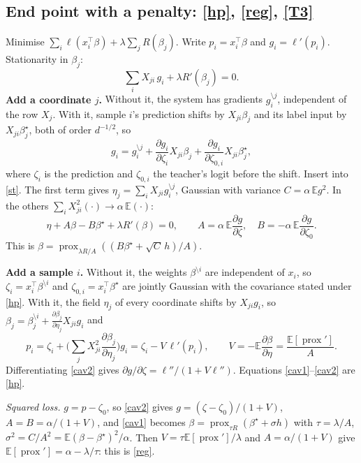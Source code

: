 \documentclass[10pt]{article}
\newcommand{\bs}{\beta^\star}\newcommand{\E}{\mathbb E}\newcommand{\asinh}{\operatorname{arcsinh}}\newcommand{\prox}{\operatorname{prox}}
\begin{document}
\subsection{End point with a penalty: \eqref{hp}, \eqref{reg}, \eqref{T3}}
Minimise $\sum_i\ell(x_i^\top\beta)+\lambda\sum_jR(\beta_j)$. Write $p_i=x_i^\top\beta$ and $g_i=\ell'(p_i)$. Stationarity in $\beta_j$:
\begin{equation}\label{st}
\sum_iX_{ji}\,g_i+\lambda R'(\beta_j)=0 .
\end{equation}
\textbf{Add a coordinate $j$.} Without it, the system has gradients $g_i^{\setminus j}$, independent of the row $X_j$. With it, sample $i$'s prediction shifts by $X_{ji}\beta_j$ and its label input by $X_{ji}\bs_j$, both of order $d^{-1/2}$, so
\[
g_i=g_i^{\setminus j}+\frac{\partial g_i}{\partial\zeta_i}X_{ji}\beta_j+\frac{\partial g_i}{\partial\zeta_{0,i}}X_{ji}\bs_j ,
\]
where $\zeta_i$ is the prediction and $\zeta_{0,i}$ the teacher's logit before the shift. Insert into \eqref{st}. The first term gives $\eta_j=\sum_iX_{ji}g_i^{\setminus j}$, Gaussian with variance $C=\alpha\,\E g^2$. In the others $\sum_iX_{ji}^2(\cdot)\to\alpha\,\E(\cdot)$:
\begin{equation}\label{cav1}
\eta+A\beta-B\bs+\lambda R'(\beta)=0,\qquad A=\alpha\,\E\frac{\partial g}{\partial\zeta},\quad B=-\alpha\,\E\frac{\partial g}{\partial\zeta_0}.
\end{equation}
This is $\beta=\prox_{\lambda R/A}((B\bs+\sqrt C\,h)/A)$.

\textbf{Add a sample $i$.} Without it, the weights $\beta^{\setminus i}$ are independent of $x_i$, so $\zeta_i=x_i^\top\beta^{\setminus i}$ and $\zeta_{0,i}=x_i^\top\bs$ are jointly Gaussian with the covariance stated under \eqref{hp}. With it, the field $\eta_j$ of every coordinate shifts by $X_{ji}g_i$, so $\beta_j=\beta_j^{\setminus i}+\frac{\partial\beta_j}{\partial\eta_j}X_{ji}g_i$ and
\begin{equation}\label{cav2}
p_i=\zeta_i+\Big(\sum_jX_{ji}^2\frac{\partial\beta_j}{\partial\eta_j}\Big)g_i=\zeta_i-V\,\ell'(p_i),\qquad V=-\E\frac{\partial\beta}{\partial\eta}=\frac{\E[\prox{}']}{A}.
\end{equation}
Differentiating \eqref{cav2} gives $\partial g/\partial\zeta=\ell''/(1+V\ell'')$. Equations \eqref{cav1}--\eqref{cav2} are \eqref{hp}.

\emph{Squared loss.} $g=p-\zeta_0$, so \eqref{cav2} gives $g=(\zeta-\zeta_0)/(1+V)$, $A=B=\alpha/(1+V)$, and \eqref{cav1} becomes $\beta=\prox_{\tau R}(\bs+\sigma h)$ with $\tau=\lambda/A$, $\sigma^2=C/A^2=\E(\beta-\bs)^2/\alpha$. Then $V=\tau\E[\prox{}']/\lambda$ and $A=\alpha/(1+V)$ give $\E[\prox{}']=\alpha-\lambda/\tau$: this is \eqref{reg}.
\end{document}
